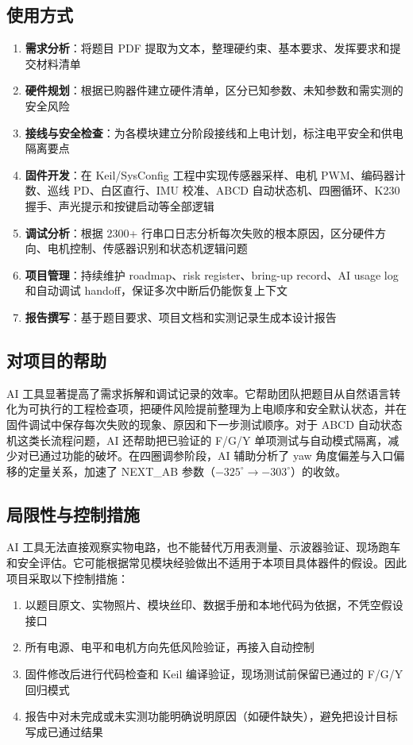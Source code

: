 \documentclass[12pt,a4paper]{ctexart}
\begin{document}
\subsection{使用方式}
\begin{enumerate}[nosep]
    \item \textbf{需求分析}：将题目 PDF 提取为文本，整理硬约束、基本要求、发挥要求和提交材料清单
    \item \textbf{硬件规划}：根据已购器件建立硬件清单，区分已知参数、未知参数和需实测的安全风险
    \item \textbf{接线与安全检查}：为各模块建立分阶段接线和上电计划，标注电平安全和供电隔离要点
    \item \textbf{固件开发}：在 Keil/SysConfig 工程中实现传感器采样、电机 PWM、编码器计数、巡线 PD、白区直行、IMU 校准、ABCD 自动状态机、四圈循环、K230 握手、声光提示和按键启动等全部逻辑
    \item \textbf{调试分析}：根据 2300+ 行串口日志分析每次失败的根本原因，区分硬件方向、电机控制、传感器识别和状态机逻辑问题
    \item \textbf{项目管理}：持续维护 roadmap、risk register、bring-up record、AI usage log 和自动调试 handoff，保证多次中断后仍能恢复上下文
    \item \textbf{报告撰写}：基于题目要求、项目文档和实测记录生成本设计报告
\end{enumerate}

\subsection{对项目的帮助}
AI 工具显著提高了需求拆解和调试记录的效率。它帮助团队把题目从自然语言转化为可执行的工程检查项，把硬件风险提前整理为上电顺序和安全默认状态，并在固件调试中保存每次失败的现象、原因和下一步测试顺序。对于 ABCD 自动状态机这类长流程问题，AI 还帮助把已验证的 F/G/Y 单项测试与自动模式隔离，减少对已通过功能的破坏。在四圈调参阶段，AI 辅助分析了 yaw 角度偏差与入口偏移的定量关系，加速了 NEXT\_AB 参数（$-325^\circ \rightarrow -303^\circ$）的收敛。

\subsection{局限性与控制措施}
AI 工具无法直接观察实物电路，也不能替代万用表测量、示波器验证、现场跑车和安全评估。它可能根据常见模块经验做出不适用于本项目具体器件的假设。因此项目采取以下控制措施：

\begin{enumerate}[nosep]
    \item 以题目原文、实物照片、模块丝印、数据手册和本地代码为依据，不凭空假设接口
    \item 所有电源、电平和电机方向先低风险验证，再接入自动控制
    \item 固件修改后进行代码检查和 Keil 编译验证，现场测试前保留已通过的 F/G/Y 回归模式
    \item 报告中对未完成或未实测功能明确说明原因（如硬件缺失），避免把设计目标写成已通过结果
\end{enumerate}
\end{document}
